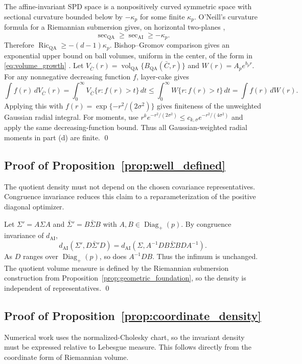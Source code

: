 \documentclass[
  12pt]{article}
\newcommand{\Diagp}{\operatorname{Diag}_{+}}
\newcommand{\vol}{\operatorname{vol}}
\newcommand{\Ric}{\operatorname{Ric}}
\newcommand{\QA}{\mathrm{QA}}
\newcommand{\AI}{\mathrm{AI}}
\begin{document}
The affine-invariant SPD space is a nonpositively curved symmetric space with sectional curvature bounded below by $-\kappa_p$ for some finite $\kappa_p$. O'Neill's curvature formula for a Riemannian submersion gives, on horizontal two-planes \citep{oneill_1966_FundamentalEquationsSubmersion},
\[
\sec_{\QA}\ge \sec_{\AI}\ge -\kappa_p.
\]
Therefore $\Ric_{\QA}\ge-(d-1)\kappa_p$. Bishop--Gromov comparison gives an exponential upper bound on ball volumes, uniform in the center, of the form in \eqref{eq:volume_growth} \citet[Chapter~IV]{sakai_1996_RiemannianGeometry}. Let $V_{\bar C}(r)=\vol_{\QA}\{B_{\QA}(\bar C,r)\}$ and $W(r)=A_p e^{b_pr}$. For any nonnegative decreasing function $f$, layer-cake gives
\[
\int f(r)\,dV_{\bar C}(r)=\int_0^\infty V_{\bar C}\{r:f(r)>t\}\,dt\le \int_0^\infty W\{r:f(r)>t\}\,dt=\int f(r)\,dW(r).
\]
Applying this with $f(r)=\exp\{-r^2/(2\sigma^2)\}$ gives finiteness of the unweighted Gaussian radial integral. For moments, use $r^k e^{-r^2/(2\sigma^2)}\le c_{k,\sigma} e^{-r^2/(4\sigma^2)}$ and apply the same decreasing-function bound. Thus all Gaussian-weighted radial moments in part (d) are finite. \qed

\subsection{Proof of Proposition~\ref{prop:well_defined}}

The quotient density must not depend on the chosen covariance representatives. Congruence invariance reduces this claim to a reparameterization of the positive diagonal optimizer.

Let $\Sigma'=A\Sigma A$ and $\bar\Sigma'=B\bar\Sigma B$ with $A,B\in\Diagp(p)$. By congruence invariance of $d_{\AI}$,
\[
d_{\AI}(\Sigma',D\bar\Sigma'D)=d_{\AI}(\Sigma,A^{-1}DB\bar\Sigma BDA^{-1}).
\]
As $D$ ranges over $\Diagp(p)$, so does $A^{-1}DB$. Thus the infimum is unchanged. The quotient volume measure is defined by the Riemannian submersion construction from Proposition~\ref{prop:geometric_foundation}, so the density is independent of representatives. \qed

\subsection{Proof of Proposition~\ref{prop:coordinate_density}}

Numerical work uses the normalized-Cholesky chart, so the invariant density must be expressed relative to Lebesgue measure. This follows directly from the coordinate form of Riemannian volume.
\end{document}
